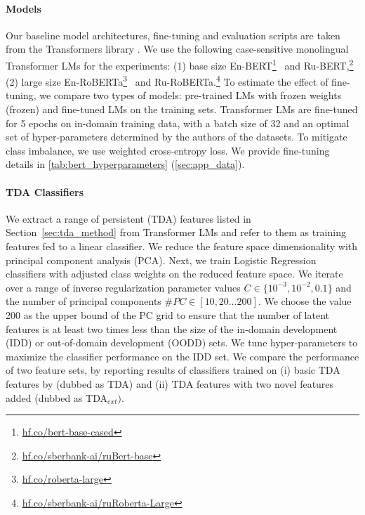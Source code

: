 \documentclass[11pt]{article}
\begin{document}
\paragraph{Models}
Our baseline model architectures, fine-tuning and evaluation scripts are taken from the Transformers library \cite{wolf-etal-2020-transformers}. 
We use the following case-sensitive monolingual Transformer LMs for the experiments: 
(1) base size En-BERT\footnote{\href{https://huggingface.co/bert-base-cased}{hf.co/bert-base-cased}}~\cite{devlin-etal-2019-bert} and Ru-BERT,\footnote{\href{https://huggingface.co/sberbank-ai/ruBert-base}{hf.co/sberbank-ai/ruBert-base}} (2) large size En-RoBERTa\footnote{\href{https://huggingface.co/roberta-large}{hf.co/roberta-large}}~\cite{liu2019roberta} and Ru-RoBERTa.\footnote{\href{https://huggingface.co/sberbank-ai/ruRoberta-large}{hf.co/sberbank-ai/ruRoberta-Large}}
To estimate the effect of fine-tuning, we compare two types of models: pre-trained LMs with frozen weights (frozen) and fine-tuned LMs on the training sets.
Transformer LMs are fine-tuned for 5 epochs on in-domain training data, with a batch size of 32 and an optimal set of hyper-parameters determined by the authors of the datasets.
To mitigate class imbalance, we use weighted cross-entropy loss.
We provide fine-tuning details in \autoref{tab:bert_hyperparameters} (\autoref{sec:app_data}). 
\paragraph{TDA Classifiers}
We extract a range of persistent (TDA) features listed in Section~\ref{sec:tda_method} from Transformer LMs and refer to them as training features fed to a linear classifier.  
We reduce the feature space dimensionality with principal component analysis (PCA).
Next, we train Logistic Regression classifiers with adjusted class weights on the reduced feature space.
We iterate over a range of inverse regularization parameter values $C\in \{10^{-3},10^{-2}, 0.1\}$ and the number of principal components $\#PC\in [10,20\dots200]$. 
We choose the value 200 as the upper bound of the PC grid to ensure that the number of latent features is at least two times less than the size of the  in-domain development (IDD) or out-of-domain development (OODD) sets. 
We tune hyper-parameters to maximize the classifier performance on the IDD set.
We compare the performance of two feature sets, by reporting results of classifiers trained on (i) basic TDA features by \citealp{kushnareva-etal-2021-artificial} (dubbed as TDA) and  (ii) TDA features with two novel features added (dubbed as TDA$_{ext})$. 
\end{document}
